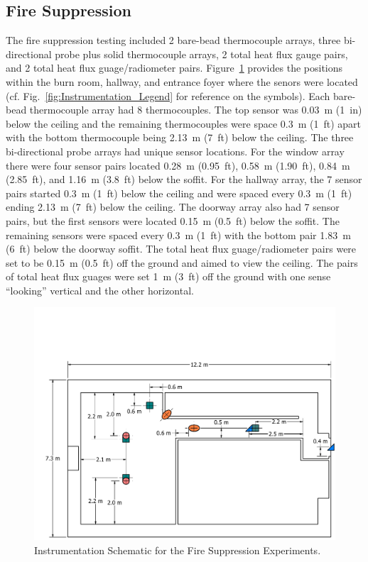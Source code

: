 \documentclass[12pt,oneside]{book}
\begin{document}
\clearpage

\subsection{Fire Suppression}
\label{subsec:Fire_Suppression_Instrumentation}

The fire suppression testing included 2 bare-bead thermocouple arrays, three bi-directional probe plus solid thermocouple arrays, 2 total heat flux gauge pairs, and 2 total heat flux guage/radiometer pairs. Figure~\ref{fig:Fire_Suppression_Instrumentation_Dimensions} provides the positions within the burn room, hallway, and entrance foyer where the senors were located (cf. Fig.~\ref{fig:Instrumentation_Legend} for reference on the symbols). Each bare-bead thermocouple array had 8 thermocouples. The top sensor was 0.03~m (1~in) below the ceiling and the remaining thermocouples were space 0.3~m (1~ft) apart with the bottom thermocouple being 2.13~m (7~ft) below the ceiling. The three bi-directional probe arrays had unique sensor locations. For the window array there were four sensor pairs located 0.28~m (0.95~ft), 0.58~m (1.90~ft), 0.84~m (2.85~ft), and 1.16~m (3.8~ft) below the soffit. For the hallway array, the 7 sensor pairs started 0.3~m (1~ft) below the ceiling and were spaced every 0.3~m (1~ft) ending 2.13~m (7~ft) below the ceiling. The doorway array also had 7 sensor pairs, but the first sensors were located 0.15~m (0.5~ft) below the soffit. The remaining sensors were spaced every 0.3~m (1~ft) with the bottom pair 1.83~m (6~ft) below the doorway soffit. The total heat flux guage/radiometer pairs were set to be 0.15~m (0.5~ft) off the ground and aimed to view the ceiling. The pairs of total heat flux guages were set 1~m (3~ft) off the ground with one sense ``looking'' vertical and the other horizontal.

\begin{figure}[!ht]
	\includegraphics[width=\columnwidth]{../Figures/Floor_Plans/PDFs/East_Structure/DelCo_2012_East_Structure_Instrumentation}
	\caption{Instrumentation Schematic for the Fire Suppression Experiments.}
	\label{fig:Fire_Suppression_Instrumentation_Dimensions}
\end{figure}
\end{document}
